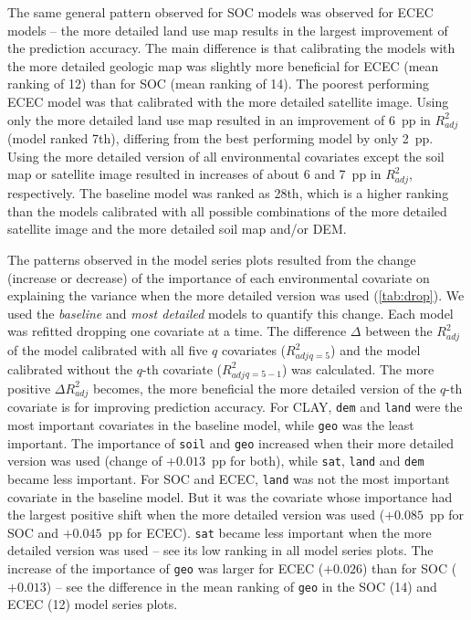 The same general pattern observed for SOC models was observed for ECEC models -- 
the more detailed land use map results in the largest improvement of the 
prediction accuracy. The main difference is that calibrating the models with 
the more detailed geologic map was slightly more beneficial for ECEC (mean 
ranking of 12) than for SOC (mean ranking of 14). The poorest performing ECEC 
model was that calibrated with the more detailed satellite image. Using only 
the more detailed land use map resulted in an improvement of 6~pp in 
${R}^{2}_{adj}$ (model ranked 7th), differing from the best performing model by 
only 2~pp. Using the more detailed version of all environmental covariates 
except the soil map or satellite image resulted in increases of about 6 and 
7~pp in ${R}^{2}_{adj}$, respectively. The baseline model was ranked as 28th, 
which is a higher ranking than the models calibrated with all possible 
combinations of the more detailed satellite image and the more detailed
soil map and/or DEM.

The patterns observed in the model series plots resulted from the change 
(increase or decrease) of the importance of each environmental covariate on 
explaining the variance when the more detailed version was used 
(\autoref{tab:drop}). We used the \textit{baseline} and \textit{most detailed} 
models to quantify this change. Each model was refitted dropping one covariate 
at a time. The difference $\Delta$ between the ${R}^{2}_{adj}$ of the model 
calibrated with all five $q$ covariates (${R}^{2}_{adj}{}_{q=5}$) and the model 
calibrated without the $q$-th covariate ($R^{2}_{adj}{}_{q=5-1}$) was calculated.
The more positive $\Delta{R}^{2}_{adj}$ becomes, the more beneficial the more 
detailed version of the $q$-th covariate is for improving prediction accuracy.
For CLAY, \texttt{dem} and \texttt{land} were the most important covariates in 
the baseline model, while \texttt{geo} was the least important. The importance 
of \texttt{soil} and \texttt{geo} increased when their more detailed version 
was used (change of $+0.013$~pp for both), while \texttt{sat}, \texttt{land} 
and \texttt{dem} became less important. For SOC and ECEC, \texttt{land} was not 
the most important covariate in the baseline model. But it was the covariate 
whose importance had the largest positive shift when the more detailed version 
was used ($+0.085$~pp for SOC and $+0.045$~pp for ECEC). \texttt{sat} became 
less important when the more detailed version was used -- see its low ranking
in all model series plots. The increase of the importance of \texttt{geo} was 
larger for ECEC ($+0.026$) than for SOC ($+0.013$) -- see the difference in the 
mean ranking of \texttt{geo} in the SOC (14) and ECEC (12) model series plots.

